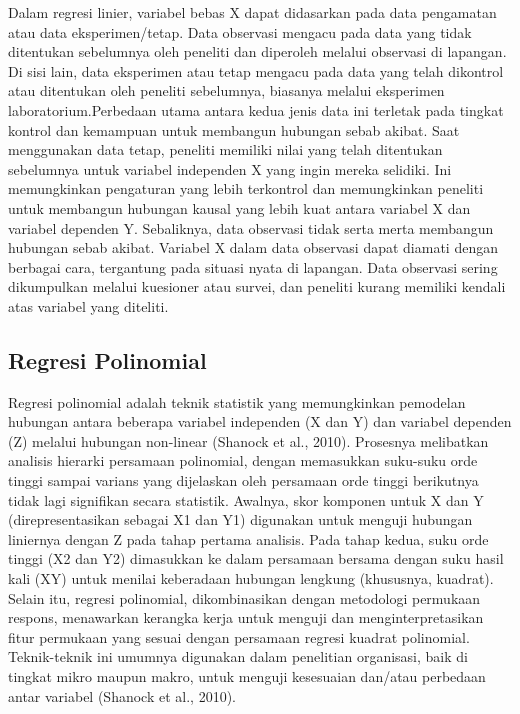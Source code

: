 Dalam regresi linier, variabel bebas X dapat didasarkan pada data pengamatan atau data eksperimen/tetap. Data observasi mengacu pada data yang tidak ditentukan sebelumnya oleh peneliti dan diperoleh melalui observasi di lapangan. Di sisi lain, data eksperimen atau tetap mengacu pada data yang telah dikontrol atau ditentukan oleh peneliti sebelumnya, biasanya melalui eksperimen laboratorium.Perbedaan utama antara kedua jenis data ini terletak pada tingkat kontrol dan kemampuan untuk membangun hubungan sebab akibat. Saat menggunakan data tetap, peneliti memiliki nilai yang telah ditentukan sebelumnya untuk variabel independen X yang ingin mereka selidiki. Ini memungkinkan pengaturan yang lebih terkontrol dan memungkinkan peneliti untuk membangun hubungan kausal yang lebih kuat antara variabel X dan variabel dependen Y. Sebaliknya, data observasi tidak serta merta membangun hubungan sebab akibat. Variabel X dalam data observasi dapat diamati dengan berbagai cara, tergantung pada situasi nyata di lapangan. Data observasi sering dikumpulkan melalui kuesioner atau survei, dan peneliti kurang memiliki kendali atas variabel yang diteliti.


\subsection{Regresi Polinomial}
\label{subsec:regresipolinomial}

Regresi polinomial adalah teknik statistik yang memungkinkan pemodelan hubungan antara beberapa variabel independen (X dan Y) dan variabel dependen (Z) melalui hubungan non-linear (Shanock et al., 2010). Prosesnya melibatkan analisis hierarki persamaan polinomial, dengan memasukkan suku-suku orde tinggi sampai varians yang dijelaskan oleh persamaan orde tinggi berikutnya tidak lagi signifikan secara statistik. Awalnya, skor komponen untuk X dan Y (direpresentasikan sebagai X1 dan Y1) digunakan untuk menguji hubungan liniernya dengan Z pada tahap pertama analisis. Pada tahap kedua, suku orde tinggi (X2 dan Y2) dimasukkan ke dalam persamaan bersama dengan suku hasil kali (XY) untuk menilai keberadaan hubungan lengkung (khususnya, kuadrat). Selain itu, regresi polinomial, dikombinasikan dengan metodologi permukaan respons, menawarkan kerangka kerja untuk menguji dan menginterpretasikan fitur permukaan yang sesuai dengan persamaan regresi kuadrat polinomial. Teknik-teknik ini umumnya digunakan dalam penelitian organisasi, baik di tingkat mikro maupun makro, untuk menguji kesesuaian dan/atau perbedaan antar variabel (Shanock et al., 2010).

